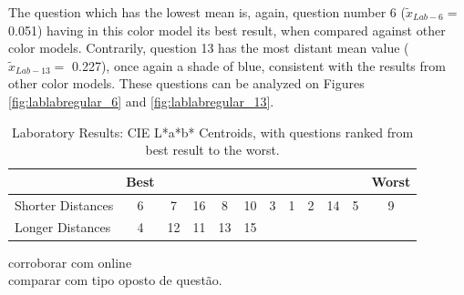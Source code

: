 %
The question which has the lowest mean is, again, question number 6 ($\tilde{x}_{Lab-6} = $ 0.051) having in this color model its best result, when compared against other color models. Contrarily, question 13 has the most distant mean value ($\tilde{x}_{Lab-13} = $ 0.227), once again a shade of blue, consistent
with the results from other color models. These questions can be analyzed on Figures \ref{fig:lablabregular_6} and \ref{fig:lablabregular_13}. \par
%
\begin{table}[htbp]
  \centering
  \begin{tabular}{@{}lccccccccccc@{}}
  \toprule
      & \multicolumn{1}{l}{Best}                        & \multicolumn{1}{l}{}                            & \multicolumn{1}{l}{}                           & \multicolumn{1}{l}{}                            & \multicolumn{1}{l}{}                            & \multicolumn{1}{l}{}                            & \multicolumn{1}{l}{}                            & \multicolumn{1}{l}{}                            & \multicolumn{1}{l}{}                            & \multicolumn{1}{l}{}                                                   & \multicolumn{1}{l}{Worst}                             \\ \midrule
  \multicolumn{1}{l|}{Shorter Distances} & \multicolumn{1}{c||}{\cellcolor[HTML]{FF8000}6} & \multicolumn{1}{c||}{\cellcolor[HTML]{0000FF}7}  & \multicolumn{1}{c||}{\cellcolor[HTML]{FF007F}16} & \multicolumn{1}{c||}{\cellcolor[HTML]{FF0000}8}  & \multicolumn{1}{c||}{\cellcolor[HTML]{0080FF}10} & \multicolumn{1}{c||}{\cellcolor[HTML]{80FF00}3} & \multicolumn{1}{c||}{\cellcolor[HTML]{FFFF00}1} & \multicolumn{1}{c||}{\cellcolor[HTML]{FF00FF}2} & \multicolumn{1}{c||}{\cellcolor[HTML]{8000FF}14} & \multicolumn{1}{c||}{\cellcolor[HTML]{FF0080}5} & \multicolumn{1}{c|}{\cellcolor[HTML]{00FF80}9}\\ \midrule
  \multicolumn{1}{l|}{Longer Distances}  & \multicolumn{1}{c||}{\cellcolor[HTML]{7F00FF}4} & \multicolumn{1}{c||}{\cellcolor[HTML]{80FF00}12} & \multicolumn{1}{c||}{\cellcolor[HTML]{FF8000}11} & \multicolumn{1}{c||}{\cellcolor[HTML]{0080FF}13} & \multicolumn{1}{c|}{\cellcolor[HTML]{00FF80}15} & & & & & & \\ \bottomrule
  \end{tabular}
  \caption[Laboratory Results: CIE L*a*b* Centroids]{Laboratory Results: CIE L*a*b* Centroids, with questions ranked from best result to the worst.}
  \label{table:centroids_labresults}
\end{table}
%
corroborar com online \\
comparar com tipo oposto de questão. \\
%

